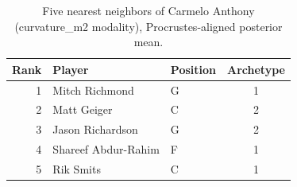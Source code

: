 \begin{table}[htbp]
  \centering\small
  \begin{tabular}{rllc}
    \toprule
    Rank & Player & Position & Archetype \\
    \midrule
    1 & Mitch Richmond & G & 1 \\
    2 & Matt Geiger & C & 2 \\
    3 & Jason Richardson & G & 2 \\
    4 & Shareef Abdur-Rahim & F & 1 \\
    5 & Rik Smits & C & 1 \\
    \bottomrule
  \end{tabular}
  \caption{Five nearest neighbors of Carmelo Anthony (curvature_m2 modality), Procrustes-aligned posterior mean.}
  \label{tab:Carmelo_Anthony_neighbors_curvature_m2}
\end{table}

